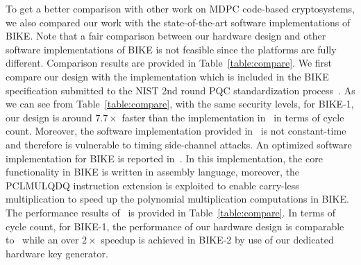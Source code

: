 \documentclass[runningheads]{llncs}
\begin{document}
To get a better comparison with other work on MDPC code-based cryptosystems,
we also compared our work with the state-of-the-art software implementations of BIKE.
Note that a fair comparison between our hardware design and other software implementations
of BIKE is not feasible since the platforms are fully different.
Comparison results are provided in Table~\ref{table:compare}.
We first compare our design with the implementation
which is included in the BIKE specification
submitted to the NIST 2nd round PQC standardization process~\cite{aragon2017bike}.
As we can see from Table~\ref{table:compare}, with the same security levels,
for BIKE-1, our design is around $7.7\times$ faster than the implementation
in~\cite{aragon2017bike}
in terms of cycle count.
Moreover, the software implementation provided in~\cite{aragon2017bike} is not constant-time and
therefore is vulnerable to timing side-channel attacks.
An optimized software implementation for BIKE is reported in~\cite{drucker2017toolbox}.
In this implementation,
the core functionality in BIKE is written in assembly language,
moreover, the PCLMULQDQ instruction extension is exploited
to enable carry-less multiplication to speed up
the polynomial multiplication computations in BIKE.
The performance results of~\cite{drucker2017toolbox}
is provided in Table~\ref{table:compare}.
In terms of cycle count, for BIKE-1, the performance of our hardware design is
comparable to~\cite{drucker2017toolbox} while an over $2\times$
speedup is achieved in BIKE-2 by use of our dedicated
hardware key generator.
\end{document}
